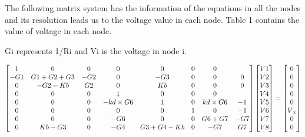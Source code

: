 The following matrix system has the information of the equations in all the nodes and its resolution leads us to the voltage value in each node. Table 1 contains the value of voltage in each node.

Gi represents 1/Ri and Vi is the voltage in node i.

\vspace{-5mm}
\begin{gather}
    \begin{bmatrix}
    1       &   0       & 0     &   0 & 0 & 0 & 0 \\
    -G1      &   G1+G2+G3       & -G2     &   0 & -G3 & 0 & 0 & 0  \\
    0       &   -G2-Kb       & G2     &   0 & Kb &0&0 & 0  \\   
    0       &   0       & 0     &   1 & 0 & 0 & 0 \\
    0 & 0 & 0 & -kd\times G6 & 1 & 0 & kd\times G6 & -1 \\
    0       &   0       & 0     & 0 &   0 & 1 & 0 & -1  \\
    0       &   0       & 0     &   -G6 & 0 & 0 & G6+G7 & -G7  \\
    0 & Kb-G3 & 0 & -G4 & G3+G4-Kb & 0 & -G7 &  G7 \\
    \end{bmatrix}
    \begin{bmatrix}
    V1     \\
    V2     \\
    V3     \\
    V4     \\
    V5     \\
    V6     \\
    V7     \\
    V8     \\
    \end{bmatrix}
    =
    \begin{bmatrix}
    0     \\
    0      \\
    0      \\
    0     \\
    0     \\
    V\textsubscript{x}      \\
    0      \\
    0   \\
    \end{bmatrix}
\end{gather}

